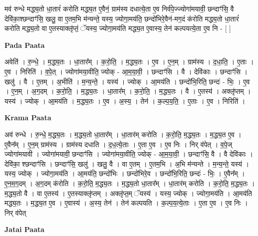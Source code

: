 \documentclass[17pt]{extarticle}
\begin{document}
मव॑ रुन्धे मद्ध्य॒तो धा॒तारं॑ करोति मद्ध्य॒त ए॒वैनं॒ ग्राम॑स्य दधात्ये॒ता ए॒व निर्व॑पे॒ज्ज्योगा॑मयावी॒ छन्दाꣳ॑सि॒ वै देवि॑का॒श्छन्दाꣳ॑सि॒ खलु॒ वा ए॒तम॒भि म॑न्यन्ते॒ यस्य॒ ज्योगा॒मय॑ति॒ छन्दो॑भिरे॒वैन॑-मग॒दं क॑रोति मद्ध्य॒तो धा॒तारं॑ करोति मद्ध्य॒तो वा ए॒तस्याक्लृ॑प्तं॒ ॅयस्य॒ ज्योगा॒मय॑ति मद्ध्य॒त ए॒वास्य॒ तेन॑ कल्पयत्ये॒ता ए॒व नि - [  ] \newline

\textbf{Pada Paata} \newline

अवेति॑ । रु॒न्धे॒ । म॒द्ध्य॒तः । धा॒तार᳚म् । क॒रो॒ति॒ । म॒द्ध्य॒तः । ए॒व । ए॒न॒म् । ग्राम॑स्य । द॒धा॒ति॒ । ए॒ताः । ए॒व । निरिति॑ । व॒पे॒त् । ज्योगा॑मया॒वीति॒ ज्योक् - आ॒म॒या॒वी॒ । छन्दाꣳ॑सि । वै । देवि॑काः । छन्दाꣳ॑सि । खलु॑ । वै । ए॒तम् । अ॒भीति॑ । म॒न्य॒न्ते॒ । यस्य॑ । ज्योक् । आ॒मय॑ति । छन्दो॑भि॒रिति॒ छन्दः॑ - भिः॒ । ए॒व । ए॒न॒म् । अ॒ग॒दम् । क॒रो॒ति॒ । म॒द्ध्य॒तः । धा॒तार᳚म् । क॒रो॒ति॒ । म॒द्ध्य॒तः । वै । ए॒तस्य॑ । अक्लृ॑प्तम् । यस्य॑ । ज्योक् । आ॒मय॑ति । म॒द्ध्य॒तः । ए॒व । अ॒स्य॒ । तेन॑ । क॒ल्प॒य॒ति॒ । ए॒ताः । ए॒व । निरिति॑ ।  \newline


\textbf{Krama Paata} \newline

अव॑ रुन्धे । रु॒न्धे॒ म॒द्ध्य॒तः । म॒द्ध्य॒तो धा॒तार᳚म् । धा॒तार॑म् करोति । क॒रो॒ति॒ म॒द्ध्य॒तः । म॒द्ध्य॒त ए॒व । ए॒वैन᳚म् । ए॒न॒म् ग्राम॑स्य । ग्राम॑स्य दधाति । द॒ध॒त्ये॒ताः । ए॒ता ए॒व । ए॒व निः । निर् व॑पेत् । व॒पे॒ज् ज्योगा॑मयावी । ज्योगा॑मयावी॒ छन्दाꣳ॑सि । ज्योगा॑मया॒वीति॒ ज्योक् - आ॒म॒या॒वी॒ । छन्दाꣳ॑सि॒ वै । वै देवि॑काः । देवि॑का॒ श्छन्दाꣳ॑सि । छन्दाꣳ॑सि॒ खलु॑ । खलु॒ वै । वा ए॒तम् । ए॒तम॒भि । अ॒भि म॑न्यन्ते । म॒न्य॒न्ते॒ यस्य॑ । यस्य॒ ज्योक् । ज्योगा॒मय॑ति । आ॒मय॑ति॒ छन्दो॑भिः । छन्दो॑भिरे॒व । छन्दो॑भि॒रिति॒ छन्दः॑ - भिः॒ । ए॒वैन᳚म् । ए॒न॒म॒ग॒दम् । अ॒ग॒दम् क॑रोति । क॒रो॒ति॒ म॒द्ध्य॒तः । म॒द्ध्य॒तो धा॒तार᳚म् । धा॒तार॑म् करोति । क॒रो॒ति॒ म॒द्ध्य॒तः । म॒द्ध्य॒तो वै । वा ए॒तस्य॑ । ए॒तस्याक्लृ॑प्तम् । अक्लृ॑प्त॒म् ॅयस्य॑ । यस्य॒ ज्योक् । ज्योगा॒मय॑ति । आ॒मय॑ति मद्ध्य॒तः । म॒द्ध्य॒त ए॒व । ए॒वास्य॑ । अ॒स्य॒ तेन॑ । तेन॑ कल्पयति । क॒ल्प॒य॒त्ये॒ताः । ए॒ता ए॒व । ए॒व निः । निर् व॑पेत् \newline

\textbf{Jatai Paata} \newline
\end{document}
